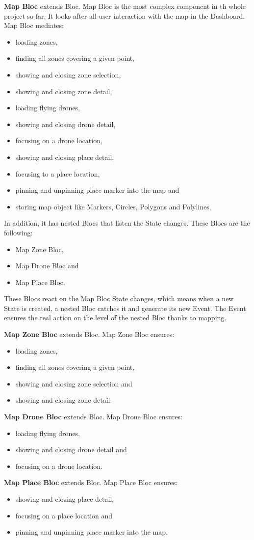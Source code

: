 \textbf{Map Bloc} extends Bloc.
Map Bloc is the most complex component in th whole project so far.
It looks after all user interaction with the map in the Dashboard.
Map Bloc mediates:
\begin{itemize}
    \item loading zones,
    \item finding all zones covering a given point,
    \item showing and closing zone selection,
    \item showing and closing zone detail,
    \item loading flying drones,
    \item showing and closing drone detail,
    \item focusing on a drone location,
    \item showing and closing place detail,
    \item focusing to a place location,
    \item pinning and unpinning place marker into the map and
    \item storing map object like Markers, Circles, Polygons and Polylines.
\end{itemize}
In addition, it has nested Blocs that listen the State changes.
These Blocs are the following:
\begin{itemize}
    \item Map Zone Bloc,
    \item Map Drone Bloc and
    \item Map Place Bloc.
\end{itemize}
These Blocs react on the Map Bloc State changes, which means when a new State is created, a nested Bloc catches it and generate its new Event.
The Event ensures the real action on the level of the nested Bloc thanks to mapping.

\textbf{Map Zone Bloc} extends Bloc.
Map Zone Bloc ensures:
\begin{itemize}
    \item loading zones,
    \item finding all zones covering a given point,
    \item showing and closing zone selection and
    \item showing and closing zone detail.
\end{itemize}

\textbf{Map Drone Bloc} extends Bloc.
Map Drone Bloc ensures:
\begin{itemize}
    \item loading flying drones,
    \item showing and closing drone detail and
    \item focusing on a drone location.
\end{itemize}

\textbf{Map Place Bloc} extends Bloc.
Map Place Bloc ensures:
\begin{itemize}
    \item showing and closing place detail,
    \item focusing on a place location and
    \item pinning and unpinning place marker into the map.
\end{itemize}

